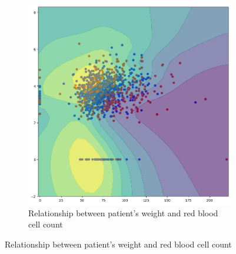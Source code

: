 \documentclass[../main.tex]{subfiles}
\begin{document}
\begin{figure}[H]
\begin{subfigure}{0.45\textwidth}
        \includegraphics[width=\linewidth]{Figure/weight-rbc.png}
        \caption{Relationship between patient's weight and red blood cell count}
        \label{fig:tabpfn-weight-rbc}
    \end{subfigure}

    \vfill


\end{figure}
\end{document}
